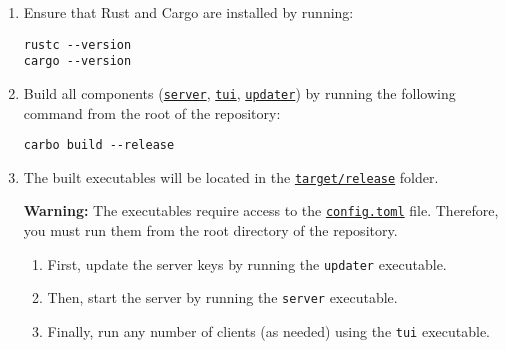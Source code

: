 \begin{enumerate}
    \item Ensure that Rust and Cargo are installed by running:
    
        \begin{lstlisting}
rustc --version
cargo --version
        \end{lstlisting}
    
    \item Build all components (\href{https://github.com/christiansassi/advanced-programming-of-cryptographic-methods-project/tree/main/server}{\texttt{server}}, \href{https://github.com/christiansassi/advanced-programming-of-cryptographic-methods-project/tree/main/tui}{\texttt{tui}}, \href{https://github.com/christiansassi/advanced-programming-of-cryptographic-methods-project/tree/main/config}{\texttt{updater}}) by running the following command from the root of the repository:

        \begin{lstlisting}
carbo build --release
        \end{lstlisting}

    \item The built executables will be located in the \href{https://github.com/christiansassi/advanced-programming-of-cryptographic-methods-project/tree/main/target/release}{\texttt{target/release}} folder.
    
        \noindent
        \begin{myWarning}
        \textbf{Warning:} The executables require access to the \href{https://github.com/christiansassi/advanced-programming-of-cryptographic-methods-project/blob/main/config/config.toml}{\texttt{config.toml}} file. Therefore, you must run them from the root directory of the repository.
        \end{myWarning}

        \begin{enumerate}
            \item First, update the server keys by running the \texttt{updater} executable.
            \item Then, start the server by running the \texttt{server} executable.
            \item Finally, run any number of clients (as needed) using the \texttt{tui} executable.
        \end{enumerate}

\end{enumerate}

